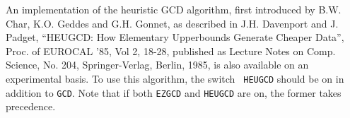 An implementation of the heuristic GCD algorithm, first introduced by B.W.
Char, K.O.  Geddes and G.H.  Gonnet, as described in J.H.  Davenport and
J.  Padget, ``HEUGCD:  How Elementary Upperbounds Generate Cheaper Data'',
Proc. of EUROCAL '85, Vol 2, 18-28, published as Lecture Notes on Comp.
Science, No. 204, Springer-Verlag, Berlin, 1985, is also available on an
experimental basis.  To use this algorithm, the switch {\tt
HEUGCD} should be on in addition to {\tt GCD}.  Note that
if both {\tt EZGCD} and {\tt HEUGCD} are on, the former takes precedence.

